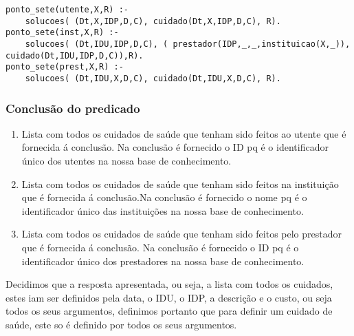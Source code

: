 \documentclass[a4paper]{report} %
\begin{document}
\begin{verbatim}
ponto_sete(utente,X,R) :- 
    solucoes( (Dt,X,IDP,D,C), cuidado(Dt,X,IDP,D,C), R).
ponto_sete(inst,X,R) :- 
    solucoes( (Dt,IDU,IDP,D,C), ( prestador(IDP,_,_,instituicao(X,_)), cuidado(Dt,IDU,IDP,D,C)),R).
ponto_sete(prest,X,R) :- 
    solucoes( (Dt,IDU,X,D,C), cuidado(Dt,IDU,X,D,C), R).
\end{verbatim}

\subsubsection{Conclusão do predicado} 
\begin{enumerate}
\item Lista com todos os cuidados de saúde que tenham sido feitos ao utente que é fornecida á conclusão. Na conclusão é fornecido o ID pq é o identificador único dos utentes na nossa base de conhecimento.
\item Lista com todos os cuidados de saúde que tenham sido feitos na instituição que é fornecida á conclusão.Na conclusão é fornecido o nome pq é o identificador único das instituições na nossa base de conhecimento.
\item Lista com todos os cuidados de saúde que tenham sido feitos pelo prestador que é fornecida á conclusão. Na conclusão é fornecido o ID pq é o identificador único dos prestadores na nossa base de conhecimento.
\end{enumerate}

Decidimos que a resposta apresentada, ou seja, a lista com todos os cuidados, estes iam ser definidos pela data, o IDU, o IDP, a descrição e o custo, ou seja todos os seus argumentos, definimos portanto que para definir um cuidado de saúde, este so é definido por todos os seus argumentos.
\end{document}
